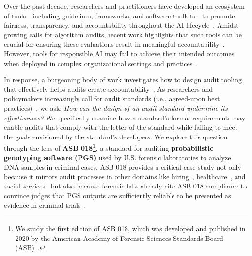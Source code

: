 Over the past decade, researchers and practitioners have developed an ecosystem of tools---including guidelines, frameworks, and software toolkits---to promote fairness, transparency, and accountability throughout the AI lifecycle~\cite{madaio2020co, holstein2019improving, lee2021landscape, raji2020closing, mitchell2019model, abebe2022adversarial}. Amidst growing calls for algorithm audits, recent work highlights that such tools can be crucial for ensuring these evaluations result in meaningful accountability~\cite{ojewale2025towards, abebe2022adversarial, lam2024framework, raji2022outsider, jin2024beyond}. However, tools for responsible AI may fail to achieve their intended outcomes when deployed in complex organizational settings and practices~\cite{wong2023seeing, berman2024scoping, deng2022exploring, rakova2021responsible, madaio2020co, schor2024mind}. 


In response, a burgeoning body of work investigates how to design audit tooling that effectively helps audits create accountability~\cite{ojewale2025towards, madaio2020co, raji2020closing, holstein2019improving, lam2024framework, raji2022outsider, abebe2022adversarial}. As researchers and policymakers increasingly call for audit standards (i.e., agreed-upon best practices)~\cite{goodman2022algorithmic, costanza2022audits, lam2024framework, raji2022outsider, groves2024auditing, aistandardshub}, we ask: \textit{How can the design of an audit standard undermine its effectiveness?} We specifically examine how a standard’s formal requirements may enable audits that comply with the letter of the standard while failing to meet the goals envisioned by the standard's developers. We explore this question through the lens of \textbf{ASB 018\footnote{We study the first edition of ASB 018, which was developed and published in 2020 by the American Academy of Forensic Sciences Standards Board (ASB)~\cite{asb018}.}}, a standard for auditing \textbf{probabilistic genotyping software (PGS)} used by U.S. forensic laboratories to analyze DNA samples in criminal cases. ASB 018 provides a critical case study not only because it mirrors audit processes in other domains like hiring~\cite{raji2022outsider, lam2024framework, groves2024auditing, gerchick2025auditing}, healthcare~\cite{obermeyer2019dissecting, wu2021medical}, and social services~\cite{chouldechova2018case} but also because forensic labs already cite ASB 018 compliance to convince judges that PGS outputs are sufficiently reliable to be presented as evidence in criminal trials~\cite{2023anderson}. 


